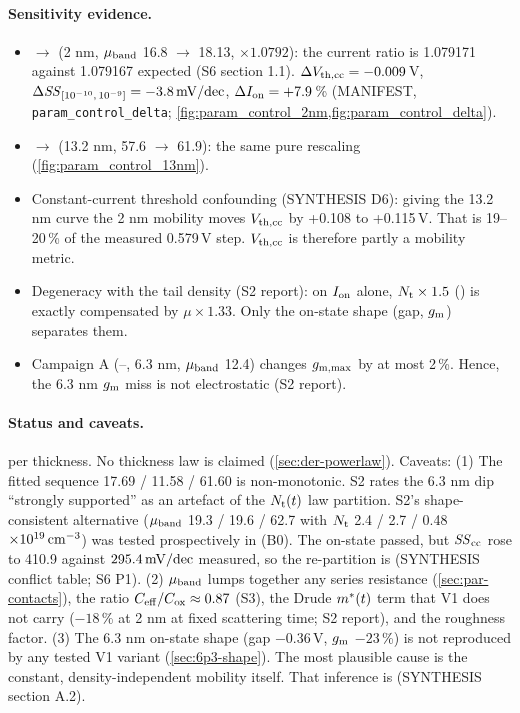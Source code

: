 \paragraph{Sensitivity evidence.}
\begin{itemize}
\item {} $\rightarrow$  (2 nm, $\mu_{\mathrm{band}}$ 16.8 $\rightarrow$ 18.13, $\times1.0792$): the current ratio is 1.079171 against 1.079167 expected (S6 section 1.1). $\Delta V_{\mathrm{th,cc}}=-0.009$\,V, $\Delta\mathit{SS}_{[10^{-10},\,10^{-9}]}=-3.8\,\mathrm{mV/dec}$, $\Delta I_{\mathrm{on}}=+7.9$\,\% (MANIFEST, \texttt{param\_control\_delta}; \cref{fig:param_control_2nm,fig:param_control_delta}).
\item {} $\rightarrow$  (13.2 nm, 57.6 $\rightarrow$ 61.9): the same pure rescaling (\cref{fig:param_control_13nm}).
\item Constant-current threshold confounding (SYNTHESIS D6): giving the 13.2 nm curve the 2 nm mobility moves $V_{\mathrm{th,cc}}$ by +0.108 to +0.115\,V. That is 19--20\,\% of the measured 0.579\,V step. $V_{\mathrm{th,cc}}$ is therefore partly a mobility metric.
\item Degeneracy with the tail density (S2 report): on $I_{\mathrm{on}}$ alone, $N_{\mathrm{t}}\times1.5$ () is exactly compensated by $\mu\times1.33$. Only the on-state shape (gap, $g_{\mathrm{m}}$) separates them.
\item Campaign A (--, 6.3 nm, $\mu_{\mathrm{band}}$ 12.4) changes $g_{\mathrm{m,max}}$ by at most 2\,\%. Hence, the 6.3 nm $g_{\mathrm{m}}$ miss is not electrostatic (S2 report).
\end{itemize}

\paragraph{Status and caveats.}
 per thickness. No thickness law is claimed (\cref{sec:der-powerlaw}). Caveats:
(1) The fitted sequence 17.69 / 11.58 / 61.60 is non-monotonic. S2 rates the 6.3 nm dip ``strongly supported'' as an artefact of the $N_{\mathrm{t}}(t)$ law partition. S2's shape-consistent alternative ($\mu_{\mathrm{band}}$ 19.3 / 19.6 / 62.7 with $N_{\mathrm{t}}$ 2.4 / 2.7 / 0.48$\times10^{19}\,\mathrm{cm}^{-3}$) was tested prospectively in  (B0). The on-state passed, but $\mathit{SS}_{\mathrm{cc}}$ rose to 410.9 against $295.4\,\mathrm{mV/dec}$ measured, so the re-partition is  (SYNTHESIS conflict table; S6 P1).
(2) $\mu_{\mathrm{band}}$ lumps together any series resistance (\cref{sec:par-contacts}), the ratio $C_{\mathrm{eff}}/C_{\mathrm{ox}}\approx0.87$ (S3), the Drude $m^{*}(t)$ term that V1 does not carry ($-18$\,\% at 2 nm at fixed scattering time; S2 report), and the roughness factor.
(3) The 6.3 nm on-state shape (gap $-0.36$\,V, $g_{\mathrm{m}}$ $-23$\,\%) is not reproduced by any tested V1 variant (\cref{sec:6p3-shape}). The most plausible cause is the constant, density-independent mobility itself. That inference is  (SYNTHESIS section A.2).

